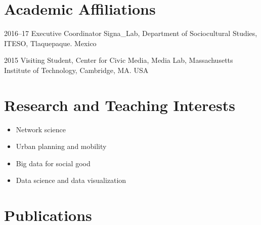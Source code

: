 \documentclass{academiccv}
\begin{document}
\section*{Academic Affiliations}

\begin{tablist}                     

\item[2016--17] \tab Executive Coordinator Signa\_Lab, Department of Sociocultural Studies, ITESO, Tlaquepaque. Mexico

\item[2015] \tab Visiting Student, Center for Civic Media,  Media Lab, Massachusetts Institute of Technology, Cambridge, MA. USA

\end{tablist}



\section*{Research and Teaching Interests}

\begin{itemize}
	
\item Network science

\item Urban planning and mobility

\item Big data for social good

\item Data science and data visualization

\end{itemize}



\section*{Publications}


	
\end{document}
